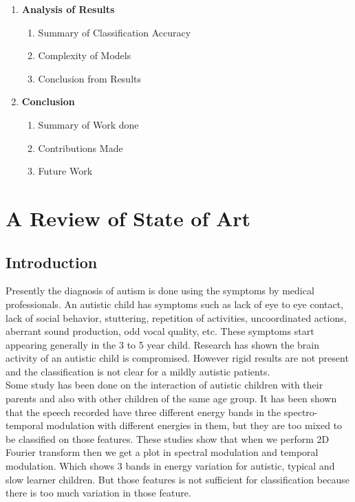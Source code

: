 \documentclass[11pt]{report}
\begin{document}
\begin{enumerate}
\item \textbf{Analysis of Results}
\begin{enumerate}
\item Summary of Classification Accuracy
\item Complexity of Models
\item Conclusion from Results
\end{enumerate}

\item \textbf{Conclusion}
\begin{enumerate}
\item Summary of Work done
\item Contributions Made
\item Future Work
\end{enumerate}

\end{enumerate}
\chapter{A Review of State of Art}
\section{Introduction}
Presently the diagnosis of autism is done using the symptoms  by medical professionals. An autistic child has symptoms such as lack of eye to eye contact, lack of social behavior, stuttering, repetition of activities, uncoordinated actions, aberrant sound production, odd vocal quality, etc. These symptoms start appearing generally in the 3 to 5 year child. Research has shown the brain activity of an autistic child is compromised. However rigid results are not present and the classification is not clear for a mildly autistic patients. \\

Some study has been done on the interaction of autistic children with their parents and also with other children of the same age group. It has been shown that the speech recorded have three different energy bands in the spectro-temporal modulation \cite{arti} with different energies in them, but they are too mixed to be classified on those features. These studies show that when we perform 2D Fourier transform then we get a plot in spectral modulation and temporal modulation. Which shows 3 bands in energy variation for autistic, typical and slow learner children. But those features is not sufficient for classification because there is too much variation in those feature. \\
\end{document}
